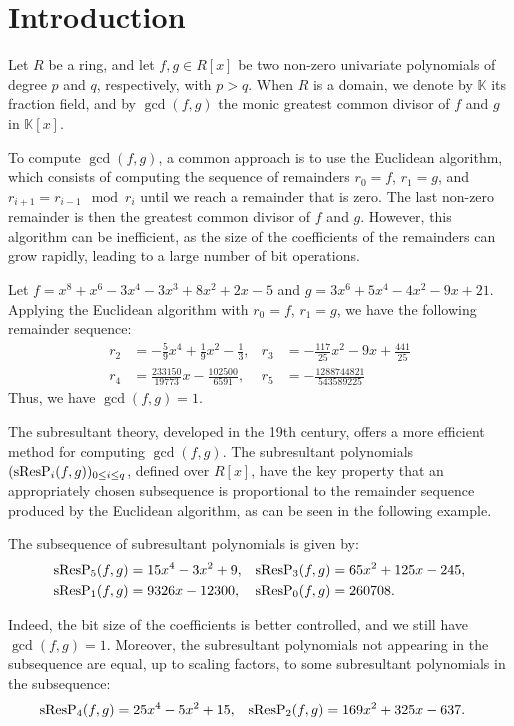 \section{Introduction}

Let $R$ be a ring, and let $f,g\in R[x]$ be two non-zero univariate polynomials of degree $p$ and $q$, respectively, with $p>q$. When $R$ is a domain, we denote by $\mathbb{K}$ its fraction field, and by $\gcd(f,g)$ the monic greatest common divisor of $f$ and $g$ in $\mathbb{K}[x]$.

To compute $\gcd(f,g)$, a common approach is to use the Euclidean algorithm, which consists of computing the sequence of remainders $r_0 = f$, $r_1 = g$, and $r_{i+1} = r_{i-1} \mod r_i$ until we reach a remainder that is zero. The last non-zero remainder is then the greatest common divisor of $f$ and $g$. However, this algorithm can be inefficient, as the size of the coefficients of the remainders can grow rapidly, leading to a large number of bit operations.

\begin{example}\label{ex:subres}
    Let $f=x^8+x^6-3x^4-3x^3+8x^2+2x-5$ and $g=3x^6+5x^4-4x^2-9x+21$. Applying the Euclidean algorithm with $r_0=f$, $r_1=g$, we have the following remainder sequence:
    \begin{align*}
        r_2 & = -\frac{5}{9}x^4+\frac{1}{9}x^2-\frac{1}{3}, &
        r_3 & = -\frac{117}{25}x^2-9x+\frac{441}{25}          \\
        r_4 & = \frac{233150}{19773}x-\frac{102500}{6591},  &
        r_5 & = -\frac{1288744821}{543589225}
    \end{align*}
    Thus, we have $\gcd(f,g) = 1$.
\end{example}

The subresultant theory, developed in the 19th century, offers a more efficient method for computing $\gcd(f,g)$. The subresultant polynomials $(\operatorname{sResP}_i(f,g))_{0\leq i\leq q}$, defined over $R[x]$, have the key property that an appropriately chosen subsequence is proportional to the remainder sequence produced by the Euclidean algorithm, as can be seen in the following example.

\addtocounter{theorem}{-1}
\begin{example}[continued]
    The subsequence of subresultant polynomials is given by:
    \begin{align*}
        \operatorname{sResP}_5(f,g) & = 15x^4-3x^2+9,   &
        \operatorname{sResP}_3(f,g) & = 65x^2+125x-245,   \\
        \operatorname{sResP}_1(f,g) & = 9326x-12300,    &
        \operatorname{sResP}_0(f,g) & = 260708.
    \end{align*}

    Indeed, the bit size of the coefficients is better controlled, and we still have $\gcd(f,g) = 1$. Moreover, the subresultant polynomials not appearing in the subsequence are equal, up to scaling factors, to some subresultant polynomials in the subsequence:
    \begin{align*}
        \operatorname{sResP}_{4}(f,g) & = 25x^4-5x^2+15,   &
        \operatorname{sResP}_{2}(f,g) & = 169x^2+325x-637.
    \end{align*}
\end{example}

